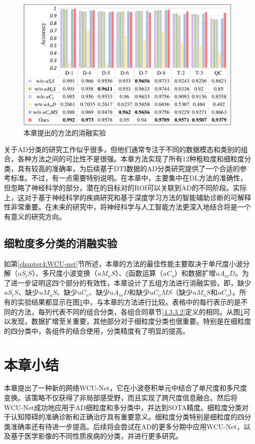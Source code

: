   \begin{figure}[ht]
      \centering
      \includegraphics[width=0.9\linewidth]{figs/paper3ablation4.pdf}
      \caption{本章提出的方法的消融实验}\label{paper3ablation}
    \end{figure}  
关于AD分类的研究工作似乎很多，但他们通常专注于不同的数据模态和类别的组合，各种方法之间的可比性不是很强。本章方法实现了所有12种粗粒度和细粒度分类，具有较高的准确率，为后续基于DTI数据的AD分类研究提供了一个合适的参考标准。不过，有一点需要特别说明。在本章中，主要集中在DL方法的准确性，但忽略了神经科学的部分，潜在的目标对的ROI可以关联到AD的不同阶段。实际上，这对于基于神经科学的疾病研究和基于深度学习方法的智能辅助诊断的可解释性非常重要。在未来的研究中，将神经科学与人工智能方法更深入地结合将是一个有意义的研究方向。

\subsection{细粒度多分类的消融实验}

如第\ref{chapter4:WCU-net}节所述，本章的方法的最佳性能主要取决于单尺度小波分解（$uS_{i}S$）、多尺度小波变换（$uM_{u}S$）、$\xi$函数运算（$uC_{o}$）和数据扩增$uA_{m}D$。为了进一步证明这四个部分的有效性，本章设计了五组方法进行消融实验，即，缺少$uS_{i}S$、缺少$uM_{u}S$、缺少$uC_{o}$、缺少$ uA_{m}D$和缺少$uC_{o}MS$（缺少$uM_{u}S$和$uC_{o}$）。所有的实验结果都显示在图\ref{paper3ablation}中，与本章的方法进行比较。表格中的每行表示的是不同的方法，每列代表不同的组合分类，各组合同章节\ref{4.3.3.2}定义的相同。从图\ref{paper3ablation}可以发现，数据扩增至关重要，其他部分对于细粒度分类也很重要。特别是在细粒度的四分类中，各组件的结合使用，分类精度有了明显的提高。



\section{本章小结}\label{chapter4.5}
本章提出了一种新的网络WCU-Net，它在小波卷积单元中结合了单尺度和多尺度变换。该策略不仅获得了非局部感受野，而且实现了跨尺度信息融合。然后将WCU-Net成功地应用于AD细粒度和多分类中，并达到SOTA精度。细粒度分类对于认知障碍的准确诊断和正确治疗具有重要意义。细粒度分类特别是细粒度的四分类准确率还有待进一步提高。后续将会尝试在AD的更多分期中应用WCU-Net，以及基于医学影像的不同性质疾病的分类，并进行更多研究。